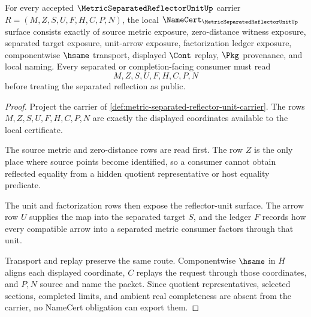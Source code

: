 \begin{theorem}
\label{thm:metric-separated-reflector-unit-namecert-obligations}
For every accepted $\MetricSeparatedReflectorUnitUp$ carrier $R=(M,Z,S,U,F,H,C,P,N)$, the local $\NameCert_{\MetricSeparatedReflectorUnitUp}$ surface consists exactly of source metric exposure, zero-distance witness exposure, separated target exposure, unit-arrow exposure, factorization ledger exposure, componentwise $\hsame$ transport, displayed $\Cont$ replay, $\Pkg$ provenance, and local naming. Every separated or completion-facing consumer must read
$$
M,Z,S,U,F,H,C,P,N
$$
before treating the separated reflection as public.
\end{theorem}
\begin{proof}
Project the carrier of \autoref{def:metric-separated-reflector-unit-carrier}. The rows $M,Z,S,U,F,H,C,P,N$ are exactly the displayed coordinates available to the local certificate.

The source metric and zero-distance rows are read first. The row $Z$ is the only place where source points become identified, so a consumer cannot obtain reflected equality from a hidden quotient representative or host equality predicate.

The unit and factorization rows then expose the reflector-unit surface. The arrow row $U$ supplies the map into the separated target $S$, and the ledger $F$ records how every compatible arrow into a separated metric consumer factors through that unit.

Transport and replay preserve the same route. Componentwise $\hsame$ in $H$ aligns each displayed coordinate, $C$ replays the request through those coordinates, and $P,N$ source and name the packet. Since quotient representatives, selected sections, completed limits, and ambient real completeness are absent from the carrier, no NameCert obligation can export them.
\end{proof}


